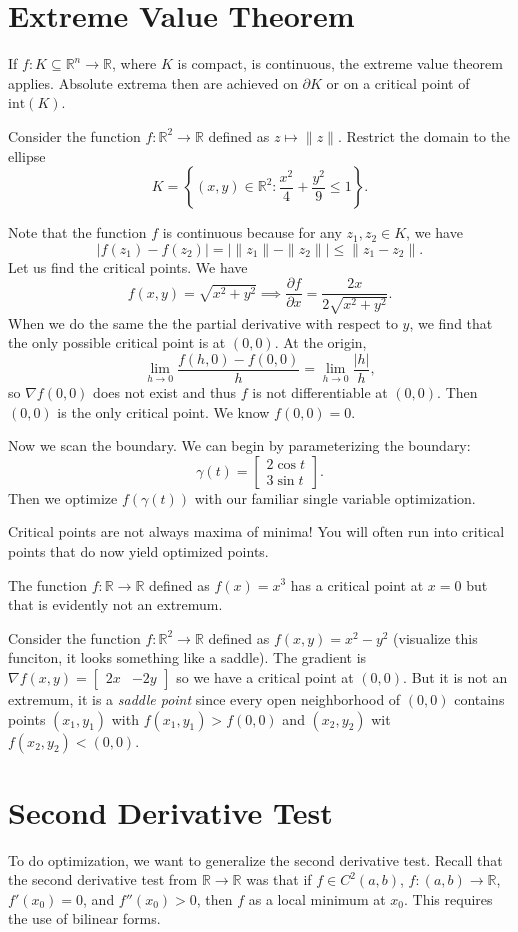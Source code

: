 \documentclass[11pt]{article}
\theoremstyle{definition}
\newcommand{\R}{\mathbb{R}}                      %
\newcommand{\mat}{\begin{bmatrix}}
\newcommand{\trix}{\end{bmatrix}}
\newcommand{\dell}{\partial}
\begin{document}
\section{Extreme Value Theorem}

If $f:K\subseteq \R^n\to \R$, where $K$ is compact, is continuous, the extreme value theorem applies. Absolute extrema then are achieved on $\dell K$ or on a critical point of $\mathrm{int}(K)$. 

\ex Consider the function $f:\R^2\to \R$ defined as $z\mapsto \|z\|$. Restrict the domain to the ellipse
$$
K=\left\{(x,y)\in \R^2:\frac{x^2}{4}+\frac{y^2}{9}\leq 1\right\}.
$$

Note that the function $f$ is continuous because for any $z_1,z_2\in K$, we have
$$
|f(z_1)-f(z_2)|=|\|z_1\|-\|z_2\||\leq \|z_1-z_2\|.
$$
Let us find the critical points. We have
$$
f(x,y)=\sqrt{x^2+y^2}\implies \frac{\dell f}{\dell x}=\frac{2x}{2\sqrt{x^2+y^2}}.
$$
When we do the same the the partial derivative with respect to $y$, we find that the only possible critical point is at $(0,0)$. At the origin,
$$
\lim_{h\to 0} \frac{f(h,0)-f(0,0)}{h}=\lim_{h\to 0} \frac{|h|}{h},
$$
so $\nabla f(0,0)$ does not exist and thus $f$ is not differentiable at $(0,0)$. Then $(0,0)$ is the only critical point. We know $f(0,0)=0$.

Now we scan the boundary. We can begin by parameterizing the boundary:
$$
\gamma(t)=\mat 2\cos t \\ 3\sin t \trix.
$$
Then we optimize $f(\gamma(t))$ with our familiar single variable optimization.

\note Critical points are not always maxima of minima! You will often run into critical points that do now yield optimized points.

\ex The function $f:\R\to\R$ defined as $f(x)=x^3$ has a critical point at $x=0$ but that is evidently not an extremum.

\ex Consider the function $f:\R^2\to\R$ defined as $f(x,y)=x^2-y^2$ (visualize this funciton, it looks something like a saddle). The gradient is $\nabla f(x,y)=\mat 2x &-2y\trix$ so we have a critical point at $(0,0)$. But it is not an extremum, it is a \textit{saddle point} since every open neighborhood of $(0,0)$ contains points $(x_1,y_1)$ with $f(x_1,y_1)>f(0,0)$ and $(x_2,y_2)$ wit $f(x_2,y_2)<(0,0)$. 

\section{Second Derivative Test}
To do optimization, we want to generalize the second derivative test. Recall that the second derivative test from $\R\to\R$ was that if $f\in C^2(a,b)$, $f:(a,b)\to \R$, $f'(x_0)=0$, and $f''(x_0)>0$, then $f$ as a local minimum at $x_0$. This requires the use of bilinear forms.
\end{document}

